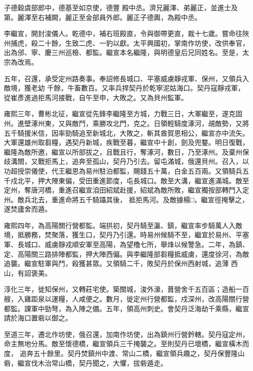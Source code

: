 \begin{pinyinscope}
 子德穀虞部郎中，德基至如京使，德豐
 殿中丞。濟兄麗澤、弟麗正，並進士及第。麗澤至右補闕，麗正至金部員外郎。麗正子德輿，為殿中丞。



 李繼宣，開封浚儀人。乾德中，補右班殿直，令與御帶更直，裁十七歲。嘗命往陜州捕虎，殺二十餘，生致二虎、一豹以獻。太平興國初，掌南作坊使，改供奉官，出為邠、寧、慶三州巡檢、都監。繼宣本名繼隆，與明德皇后兄同姓名。至是，太宗為改焉。



 五年，召還，承受定州路奏事。奉詔修長城口、平塞威虜靜戎軍、保州，又領兵入敵境，獲老幼
 千餘，牛畜數百。又率兵捍契丹於乾寧泥姑海口。契丹寇靜戎軍，從崔彥進過拒馬河接戰，自午至申，大敗之。又為貝州監軍。



 雍熙三年，曹彬北征，繼宣從先鋒李繼隆至方城，力戰三日，大軍繼至，遂克固州。進壁涿州東，又與敵鬥，乘勝攻北門，克之。日領輕騎度涿河，覘敵勢，又將五千騎援米信，因率勁騎追至新城北，大敗之，斬其酋賀恩相公，繼宣亦中流矢。大軍還雄州取芻糧，遇契丹新城，疾戰至暮，繼宣中十創，劍及兜鍪。明日復戰，
 繼隆為敵所邀，繼宣以所部拔之，且戰且行，奪涿河，數日，乃至涿州。及棄州保歧溝關，又戰拒馬上，追奔至孤山，契丹乃引去。留屯滿城，俄還貝州。召入，以功超授崇儀使，代王繼恩為易州駐泊都監，賜錢五十萬，白金五百兩。又領騎兵五千戍北平，押大陣東偏，受田重進節度，屯長城口。敵至大溝，繼宣進滿城。敵至定州，奪唐河橋，重進召繼宣洎田紹斌赴援，紹斌為敵所敗，繼宣獨按部轉鬥入定州。敵兵北去，重進命將五千騎躡其後，
 抵拒馬河。及敵據楊□，繼宣徑掩擊之，遂焚廬舍而遁。



 雍熙四年，為高陽關行營都監。端拱初，契丹騎至瀛、鎮，繼宣率步騎萬人入敵境，抵勝務，焚聚落，獲生口，契丹乃引還。時易州候騎不至，繼宣於易州、平塞軍、長城口、威虜靜戎順安軍至高陽，為望櫓七所，舉烽以候警急。二年，為鎮、定、高陽關三路排陣都監，押大陣西偏。與李繼隆部芻糧抵威虜，還度徐河，為敵追襲。繼宣駐軍與鬥，殺獲甚眾。又領騎二千，敗契丹於保州西射城，追薄
 西山，有詔褒美。



 淳化三年，徙知保州，又轉莊宅使。築關城，浚外濠，葺營舍千五百區；造船一百艘，入雞距泉以運糧，人咸便之。數月，徙定州行營都監，戍深州，改高陽關行營都監。課軍中勁弩，為入陣之備。五年，領高州刺史。會契丹泛海劫千乘縣，繼宣請於海口置砦以御之。



 至道三年，遷北作坊使，俄召還，加南作坊使，出為鎮州行營鈐轄。契丹寇定州，命主無地分馬。敵至懷德橋，繼宣領兵三千掩襲之。至則契丹已壞橋，繼宣橫木而度，
 追奔五十餘里。契丹焚鎮州中渡、常山二橋，繼宣領兵趣之，契丹保豐隆山砦，繼宣伐木治常山橋，契丹聞之，大懼，拔砦遁走。




\end{pinyinscope}
